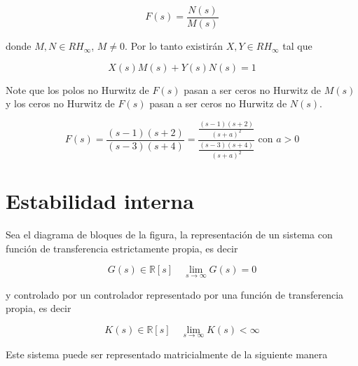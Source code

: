         \begin{equation*}
            F(s) = \frac{N(s)}{M(s)}
        \end{equation*}

        donde $M, N \in RH_{\infty}$, $M \ne 0$.
        Por lo tanto existirán $X, Y \in RH_{\infty}$ tal que

        \begin{equation}
            X(s) M(s) + Y(s) N(s) = 1
        \end{equation}

        Note que los polos no Hurwitz de $F(s)$ pasan a ser ceros no Hurwitz de $M(s)$ y los ceros no Hurwitz de $F(s)$ pasan a ser ceros no Hurwitz de $N(s)$.

        \begin{equation*}
            F(s) = \frac{(s-1)(s+2)}{(s-3)(s+4)} = \frac{\frac{(s-1)(s+2)}{(s+a)^2}}{\frac{(s-3)(s+4)}{(s+a)^2}} \text{ con } a > 0
        \end{equation*}


    \section{Estabilidad interna}

        Sea el diagrama de bloques de la figura, la representación de un sistema con función de transferencia estrictamente propia, es decir

        \begin{equation*}
            G(s) \in \mathbb{R}[s] \quad \lim_{s \to \infty} G(s) = 0
        \end{equation*}

        y controlado por un controlador representado por una función de transferencia propia, es decir

        \begin{equation*}
            K(s) \in \mathbb{R}[s] \quad \lim_{s \to \infty} K(s) < \infty
        \end{equation*}


        Este sistema puede ser representado matricialmente de la siguiente manera

